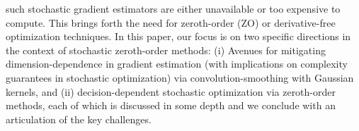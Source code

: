\documentclass[11pt,reqno]{amsart}
\newcommand{\1}{{\bf 1}}
\newcommand{\2}{{\bf 2}}
\numberwithin{equation}{section}
\theoremstyle{remark}
\begin{document}
		such stochastic gradient estimators are either unavailable or too expensive to compute. %
		This brings forth the need for 
		zeroth-order (ZO) or derivative-free optimization techniques. In this paper, our focus is on  two specific  {directions in the context of stochastic} zeroth-order methods: (i) Avenues for {mitigating dimension-dependence} in gradient estimation ({with implications on complexity guarantees in stochastic optimization}) via convolution-smoothing with Gaussian kernels, and (ii) decision-dependent stochastic optimization {via zeroth-order methods}, each of which is discussed in some depth and we conclude with an articulation of the key challenges. 
		
		
\end{document}
